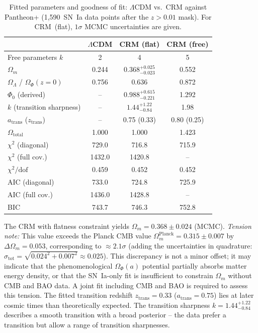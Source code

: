 \documentclass[aps,prd,twocolumn,superscriptaddress,nofootinbib]{revtex4-2}
\begin{document}
\begin{table}[htbp]
\centering
\caption{Fitted parameters and goodness of fit: $\Lambda$CDM vs.\ CRM against Pantheon+ (1,590~SN~Ia data points after the $z>0.01$ mask). For CRM~(flat), $1\sigma$ MCMC uncertainties are given.}
\label{tab:results}
\begin{tabular}{lccc}
\toprule
 & $\Lambda$CDM & CRM (flat) & CRM (free) \\
\midrule
Free parameters $k$ & 2 & 4 & 5 \\
$\Omega_m$ & 0.244 & $0.368^{+0.025}_{-0.023}$ & 0.552 \\
$\Omega_\Lambda$ / $\Omega_\Phi(z{=}0)$ & 0.756 & 0.636 & 0.872 \\
$\Phi_0$ (derived) & -- & $0.988^{+0.615}_{-0.221}$ & 1.292 \\
$k$ (transition sharpness) & -- & $1.44^{+1.22}_{-0.84}$ & 1.98 \\
$a_{\mathrm{trans}}$ ($z_{\mathrm{trans}}$) & -- & 0.75 (0.33) & 0.80 (0.25) \\
$\Omega_{\mathrm{total}}$ & 1.000 & 1.000 & 1.423 \\
\midrule
$\chi^2$ (diagonal) & 729.0 & 716.8 & 715.9 \\
$\chi^2$ (full cov.) & 1432.0 & 1420.8 & -- \\
$\chi^2/\mathrm{dof}$ & 0.459 & 0.452 & 0.452 \\
AIC (diagonal) & 733.0 & 724.8 & 725.9 \\
AIC (full cov.) & 1436.0 & 1428.8 & -- \\
BIC & 743.7 & 746.3 & 752.8 \\
\bottomrule
\end{tabular}
\end{table}

The CRM with flatness constraint yields $\Omega_m = 0.368 \pm 0.024$ (MCMC). \textit{Tension note:} This value exceeds the Planck CMB value $\Omega_m^{\mathrm{Planck}} = 0.315 \pm 0.007$ by $\Delta\Omega_m = 0.053$, corresponding to $\approx 2.1\sigma$ (adding the uncertainties in quadrature: $\sigma_{\mathrm{tot}} = \sqrt{0.024^2 + 0.007^2} \approx 0.025$). This discrepancy is not a minor offset; it may indicate that the phenomenological $\Omega_\Phi(a)$ potential partially absorbs matter energy density, or that the SN~Ia-only fit is insufficient to constrain $\Omega_m$ without CMB and BAO data. A joint fit including CMB and BAO is required to assess this tension. The fitted transition redshift $z_{\mathrm{trans}} = 0.33$ ($a_{\mathrm{trans}} = 0.75$) lies at later cosmic times than theoretically expected. The transition sharpness $k = 1.44^{+1.22}_{-0.84}$ describes a smooth transition with a broad posterior -- the data prefer a transition but allow a range of transition sharpnesses.
\end{document}
